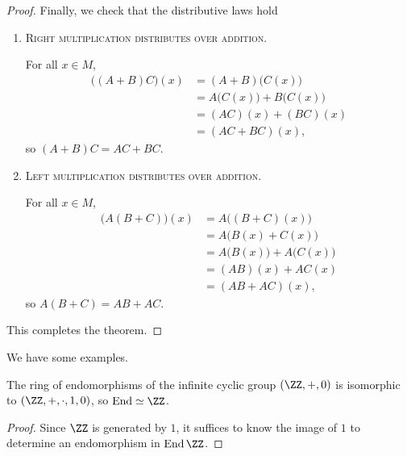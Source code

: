 \documentclass{article}
\newcommand*\isom{\ensuremath{\simeq}}
\newcommand*\End{\ensuremath{\operatorname{End}}}
\begin{document}
\begin{proof}
    Finally, we check that the distributive laws hold

    \begin{enumerate}
        \item
            \textsc{\color{Crimson} Right multiplication distributes over addition.}

            For all $x \in M$,
            \begin{align*}
                \big((A+B)C\big)(x)
                &=
                (A+B)\big(C(x)\big) \\
                &=
                A\big(C(x)\big) + B\big(C(x)\big) \\
                &=
                (AC)(x) + (BC)(x) \\
                &=
                (AC + BC)(x),
            \end{align*}
            so $(A+B)C = AC + BC$.
        \item
            \textsc{\color{Crimson} Left multiplication distributes over addition.}

            For all $x \in M$,
            \begin{align*}
                \big(A(B+C)\big)(x)
                &=
                A\big((B+C)(x)\big) \\
                &=
                A\big(B(x) + C(x)\big) \\
                &=
                A\big(B(x)\big) + A\big(C(x)\big) \\
                &=
                (AB)(x) + AC(x) \\
                &=
                (AB + AC)(x),
            \end{align*}
            so $A(B+C) = AB + AC$.

    \end{enumerate}

    This completes the theorem.
\end{proof}

We have some examples.

\begin{example}
    The ring of endomorphisms of the infinite cyclic group $(\ZZ,+,0)$ is isomorphic to $(\ZZ,+,\cdot,1,0)$, so $\End \isom \ZZ$.
\end{example}

\begin{proof}
    Since $\ZZ$ is generated by $1$, it suffices to know the image of $1$ to determine an endomorphism in $\End \ZZ$.
\end{proof}
\end{document}
